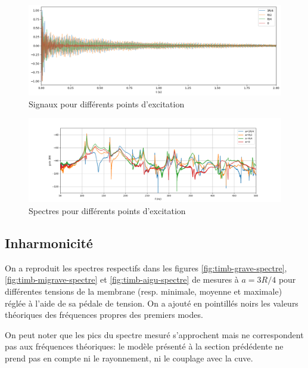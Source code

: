 \documentclass[atiam, article]{rapport} %
\begin{document}
\begin{figure}
  \begin{center}
    \includegraphics[width=\textwidth]{percu/timbale-position-frappe-temps.png}
  \end{center}
  \caption{Signaux pour différents points d'excitation}
  \label{fig:timb-position}
\end{figure}

\begin{figure}
  \begin{center}
    \includegraphics[width=\textwidth]{percu/timbale-position-frappe.png}
  \end{center}
  \caption{Spectres pour différents points d'excitation}
  \label{fig:timb-position-spectre}
\end{figure}

\subsection{Inharmonicité}

On a reproduit les spectres respectifs dans les figures \ref{fig:timb-grave-spectre}, \ref{fig:timb-migrave-spectre} et \ref{fig:timb-aigu-spectre} de mesures à $a=3R/4$ pour différentes tensions de la membrane (resp. minimale, moyenne et maximale) réglée à l'aide de sa pédale de tension. On a ajouté en pointillés noirs les valeurs théoriques des fréquences propres des premiers modes.

On peut noter que les pics du spectre mesuré s'approchent mais ne correspondent pas aux fréquences théoriques: le modèle présenté à la section prédédente ne prend pas en compte ni le rayonnement, ni le couplage avec la cuve.
\end{document}
